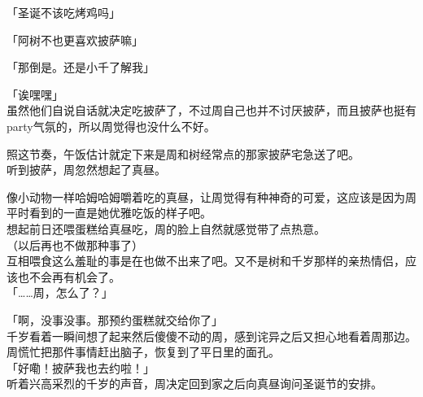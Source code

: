 「圣诞不该吃烤鸡吗」

「阿树不也更喜欢披萨嘛」

「那倒是。还是小千了解我」

「诶嘿嘿」\\

虽然他们自说自话就决定吃披萨了，不过周自己也并不讨厌披萨，而且披萨也挺有party气氛的，所以周觉得也没什么不好。

照这节奏，午饭估计就定下来是周和树经常点的那家披萨宅急送了吧。\\

听到披萨，周忽然想起了真昼。

像小动物一样哈姆哈姆嚼着吃的真昼，让周觉得有种神奇的可爱，这应该是因为周平时看到的一直是她优雅吃饭的样子吧。\\

想起前日还喂蛋糕给真昼吃，周的脸上自然就感觉带了点热意。\\

（以后再也不做那种事了）\\

互相喂食这么羞耻的事是在也做不出来了吧。又不是树和千岁那样的亲热情侣，应该也不会再有机会了。\\

「……周，怎么了？」

「啊，没事没事。那预约蛋糕就交给你了」\\

千岁看着一瞬间想了起来然后傻傻不动的周，感到诧异之后又担心地看着周那边。周慌忙把那件事情赶出脑子，恢复到了平日里的面孔。\\

「好嘞！披萨我也去约啦！」\\

听着兴高采烈的千岁的声音，周决定回到家之后向真昼询问圣诞节的安排。
